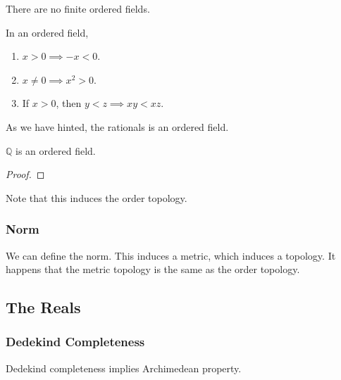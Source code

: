 \documentclass{article}
\begin{document}
      \begin{theorem}
        There are no finite ordered fields. 
      \end{theorem} 

      \begin{theorem}[Properties]
        In an ordered field, 
        \begin{enumerate}
          \item $x > 0 \implies -x < 0$. 
          \item $x \neq 0 \implies x^2 > 0$. 
          \item If $x > 0$, then $y < z \implies xy < xz$. 
        \end{enumerate}
      \end{theorem} 

      As we have hinted, the rationals is an ordered field. 

      \begin{theorem}
        $\mathbb{Q}$ is an ordered field. 
      \end{theorem} 
      \begin{proof}
        
      \end{proof}

      Note that this induces the order topology. 

    \subsubsection{Norm}  

      We can define the norm. This induces a metric, which induces a topology. It happens that the metric topology is the same as the order topology. 

  \subsection{The Reals}

    \subsubsection{Dedekind Completeness} 

      \begin{definition}
        
      \end{definition} 

      \begin{theorem}
        Dedekind completeness implies Archimedean property. 
      \end{theorem}
\end{document}
